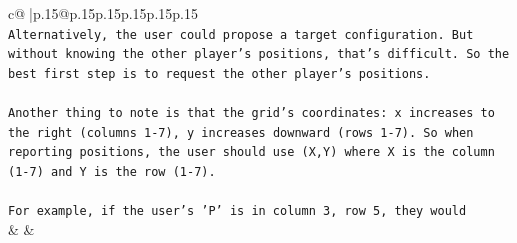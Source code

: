 \documentclass{article}
\begin{document}
{\begin{supertabular}{c@{$\;$}|p{.15\linewidth}@{}p{.15\linewidth}p{.15\linewidth}p{.15\linewidth}p{.15\linewidth}p{.15\linewidth}}
{{{\\ 
\texttt{Alternatively, the user could propose a target configuration. But without knowing the other player's positions, that's difficult. So the best first step is to request the other player's positions.} \\
\\ 
\texttt{Another thing to note is that the grid's coordinates: x increases to the right (columns 1{-}7), y increases downward (rows 1{-}7). So when reporting positions, the user should use (X,Y) where X is the column (1{-}7) and Y is the row (1{-}7).} \\
\\ 
\texttt{For example, if the user's 'P' is in column 3, row 5, they would} \\
            }
        }
    }
    & & \\ \\


\end{supertabular}}
\end{document}
